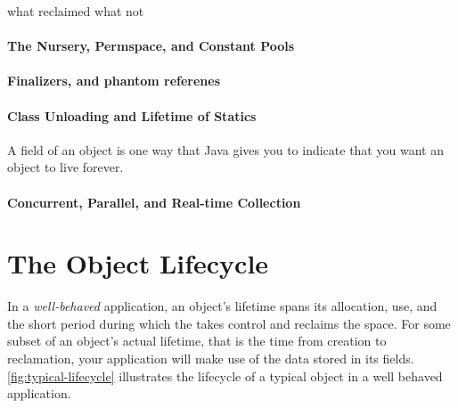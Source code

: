what reclaimed what not

\paragraph{The Nursery, Permspace, and Constant Pools}

\paragraph{Finalizers, and phantom referenes}

\paragraph{Class Unloading and Lifetime of Statics}

A  field of an object is one way that Java gives you to indicate
that you want an object to live forever.

\paragraph{Concurrent, Parallel, and Real-time Collection}


\section{The Object Lifecycle}


In a \emph{well-behaved} application, an object's lifetime spans its allocation,
use, and the short period during which the \jre takes control and reclaims the
space. For some subset of an object's actual lifetime, that is the time from
creation to reclamation, your application will make use of the data stored in its
fields. \autoref{fig:typical-lifecycle} illustrates the lifecycle of a typical
object in a well behaved application.

